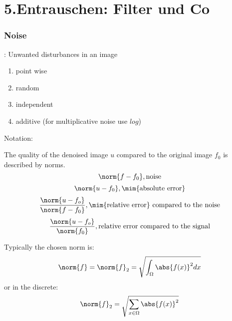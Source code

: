 \chapter{5.Entrauschen: Filter und Co}
    \subsection{Noise}
        : Unwanted disturbances in an image
        \begin{enumerate}[-]
            \item point wise
            \item random
            \item independent
            \item additive (for multiplicative noise use $log$)
        \end{enumerate}

        Notation:
        \begin{center}
        \end{center}

        The quality of the denoised image $u$ compared to the original image $f_0$ is described by norms.
        \[\norm{f-f_0}, \text{noise}\]
        \[\norm{u-f_0}, \text{\mim{absolute error}}\]
        \[\frac{\norm{u-f_o}}{\norm{f-f_0}}, \text{\mim{relative error} compared to the noise}\]
        \[\frac{\norm{u-f_o}}{\norm{f_0}}, \text{relative error compared to the signal}\]
        
        Typically the chosen norm is:
        \[\norm{f} = \norm{f}_2 = \sqrt{\int_{\Omega} \abs{f(x)}^2 dx}\]
        or in the discrete:
        \[\norm{f}_2=\sqrt{\sum_{x \in \Omega} \abs{f(x)}^2}\]

